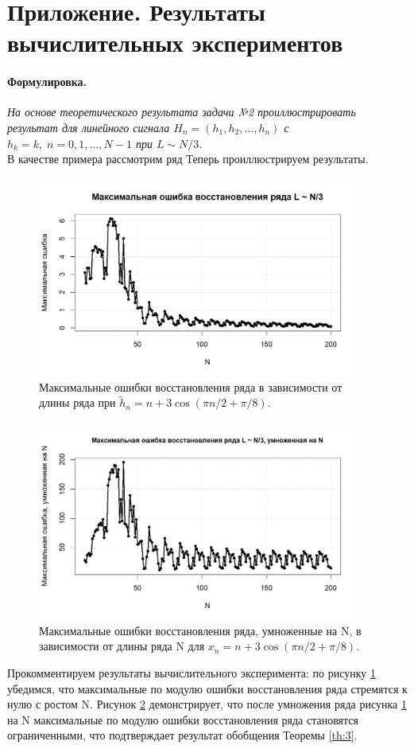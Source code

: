 \documentclass[specialist,
               substylefile = spbu_report.rtx,
               subf,href,colorlinks=true, 12pt]{disser}
\newenvironment{formulation}{\paragraph{Формулировка.}}{\hfill}
\begin{document}
\section{Приложение. Результаты вычислительных экспериментов}
\begin{formulation}
	\textit{На основе теоретического результата задачи №2 проиллюстрировать результат для линейного сигнала $H_n = (h_1, h_2, \dots, h_n)$ с $h_k = k,\;n=0,1,\dots,N-1$ при $L\sim N/3$.}
\end{formulation}\\
В качестве примера рассмотрим ряд
Теперь проиллюстрируем результаты.
\begin{figure}[!h]
	\includegraphics[width=0.95\textwidth]{Pictures/MERNoN.png}
	\caption{Максимальные ошибки восстановления ряда в зависимости от длины ряда при $\widetilde{h}_n = n + 3\cos(\pi n/2 + \pi/8)$.}\label{pic:1}
\end{figure}
\begin{figure}[!h]
	\includegraphics[width=0.95\textwidth]{Pictures/MERN.png}
	\caption{Максимальные ошибки восстановления ряда, умноженные на N, в зависимости от длины ряда N для $x_n = n + 3\cos(\pi n/2 + \pi/8)$.}\label{pic:2}
\end{figure}
\clearpage
Прокомментируем результаты вычислительного эксперимента: по рисунку \ref{pic:1} убедимся, что максимальные по модулю ошибки восстановления ряда стремятся к нулю с ростом N. Рисунок \ref{pic:2} демонстрирует, что после умножения ряда рисунка \ref{pic:1} на N максимальные по модулю ошибки восстановления ряда становятся ограниченными, что подтверждает результат обобщения Теоремы \ref{th:3}.
\end{document}
